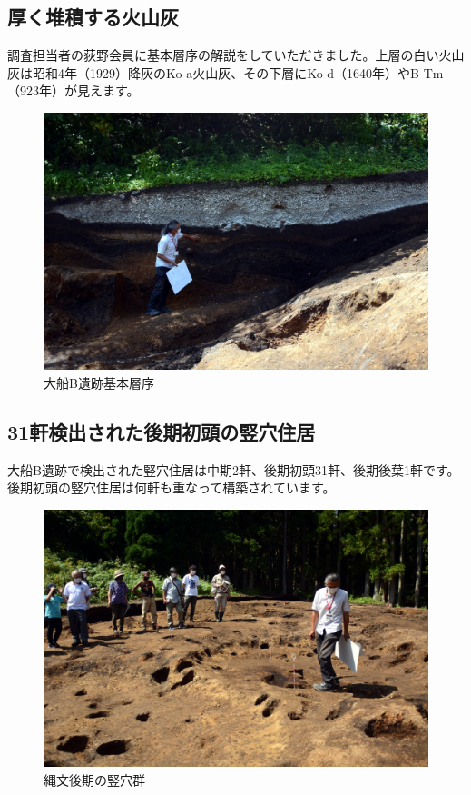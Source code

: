 \documentclass[a4j,11pt,twocolumn,openany]{jsbook}
\begin{document}
\subsection{厚く堆積する火山灰}

調査担当者の荻野会員に基本層序の解説をしていただきました。上層の白い火山灰は昭和4年（1929）降灰のKo-a火山灰、その下層にKo-d（1640年）やB-Tm（923年）が見えます。

\begin{figure}[ht]
	\centering
	\includegraphics[width=\linewidth]{fig/01_Iseki_kengaku/10_OfuneB_section.JPG}
	\caption{大船B遺跡基本層序}
	\label{}
\end{figure}

\subsection{31軒検出された後期初頭の竪穴住居}

大船B遺跡で検出された竪穴住居は中期2軒、後期初頭31軒、後期後葉1軒です。後期初頭の竪穴住居は何軒も重なって構築されています。

\begin{figure}[ht]
	\centering
	\includegraphics[width=\linewidth]{fig/01_Iseki_kengaku/11_Ofune_house.JPG}
	\caption{縄文後期の竪穴群}
	\label{}
\end{figure}
\end{document}
